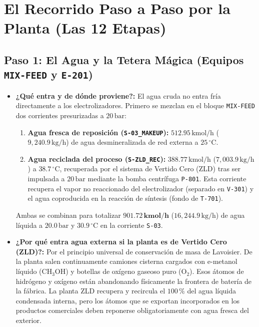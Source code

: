 \documentclass[11pt,a4paper]{article}
\begin{document}
\section{El Recorrido Paso a Paso por la Planta (Las 12 Etapas)}

\subsection{Paso 1: El Agua y la Tetera Mágica (Equipos \texttt{MIX-FEED} y \texttt{E-201})}
\begin{itemize}
    \item \textbf{¿Qué entra y de dónde proviene?:} El agua cruda no entra fría directamente a los electrolizadores. Primero se mezclan en el bloque \texttt{MIX-FEED} dos corrientes presurizadas a $20\,\text{bar}$:
    \begin{enumerate}
        \item \textbf{Agua fresca de reposición (\texttt{S-03\_MAKEUP}):} $512.95\,\text{kmol/h}$ ($9{,}240.9\,\text{kg/h}$) de agua desmineralizada de red externa a $25\,^\circ\text{C}$.
        \item \textbf{Agua reciclada del proceso (\texttt{S-ZLD\_REC}):} $388.77\,\text{kmol/h}$ ($7{,}003.9\,\text{kg/h}$) a $38.7\,^\circ\text{C}$, recuperada por el sistema de Vertido Cero (ZLD) tras ser impulsada a $20\,\text{bar}$ mediante la bomba centrífuga \texttt{P-801}. Esta corriente recupera el vapor no reaccionado del electrolizador (separado en \texttt{V-301}) y el agua coproducida en la reacción de síntesis (fondo de \texttt{T-701}).
    \end{enumerate}
    Ambas se combinan para totalizar $\mathbf{901.72\,\text{kmol/h}}$ ($16{,}244.9\,\text{kg/h}$) de agua líquida a $20.0\,\text{bar}$ y $30.9\,^\circ\text{C}$ en la corriente \texttt{S-03}.
    
    \item \textbf{¿Por qué entra agua externa si la planta es de Vertido Cero (ZLD)?:} Por el principio universal de conservación de masa de Lavoisier. De la planta salen continuamente camiones cisterna cargados con e-metanol líquido ($\text{CH}_3\text{OH}$) y botellas de oxígeno gaseoso puro ($\text{O}_2$). Esos átomos de hidrógeno y oxígeno están abandonando físicamente la frontera de batería de la fábrica. La planta ZLD recupera y recircula el $100\,\%$ del agua líquida condensada interna, pero los átomos que se exportan incorporados en los productos comerciales deben reponerse obligatoriamente con agua fresca del exterior.


\end{itemize}
\end{document}
